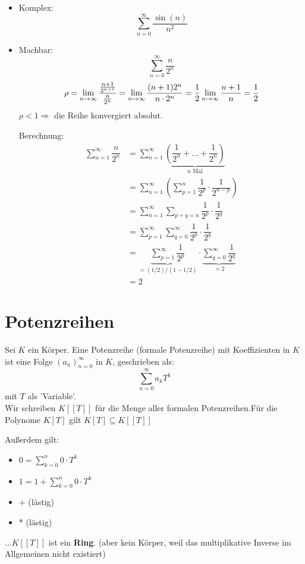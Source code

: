 \documentclass[main.tex]{subfiles}
\begin{document}
\begin{Beispiel}
  \begin{itemize}
    \item Komplex:
      $$\sum \limits_{n=0}^\infty \dfrac{\sin(n)}{n^2}$$
    \item Machbar:
      $$\sum \limits_{n=0}^\infty \dfrac{n}{2^n}$$
      $$\rho = \lim \limits_{n \to \infty} \dfrac{\frac{n+1}{2^{n+1}}}{\frac{n}{2^n}} = \lim \limits_{n \to \infty} \dfrac{(n+1)2^n}{n \cdot 2^n} = \dfrac{1}{2} \lim \limits_{n \to \infty} \dfrac{n+1}{n} = \dfrac{1}{2}$$
      $\rho < 1 \Rightarrow$ die Reihe konvergiert absolut.

      Berechnung:
      $$\begin{aligned}
        \sum \limits_{n=1}^\infty \dfrac{n}{2^n}
        &= \sum \limits_{n=1}^\infty \underbrace{\left(\dfrac{1}{2^n} + ... + \dfrac{1}{2^n}\right)}_{n \text{ Mal}}\\
        &= \sum \limits_{n=1}^\infty \left(\sum \limits_{p=1}^n \dfrac{1}{2^p} \cdot \dfrac{1}{2^{n-p}}\right)\\
        &= \sum \limits_{n=1}^\infty \sum \limits_{p + q = n} \dfrac{1}{2^p} \cdot \dfrac{1}{2^q}\\
        &= \sum \limits_{p=1}^\infty \sum \limits_{q=0}^\infty \dfrac{1}{2^p} \cdot \dfrac{1}{2^q}\\
        &= \underbrace{\sum \limits_{p=1}^\infty \dfrac{1}{2^p}}_{= (1/2)/(1-1/2)} \cdot \underbrace{\sum \limits_{q=0}^\infty \dfrac{1}{2^q}}_{= 2}\\
        &= 2
    \end{aligned}$$
  \end{itemize}
\end{Beispiel}


\section{Potenzreihen}

\begin{Definition}[Potenzreihe]
  Sei $K$ ein Körper. Eine Potenzreihe (formale Potenzreihe) mit Koeffizienten in $K$ ist eine Folge $(a_n)_{n=0}^\infty$ in $K$, geschrieben als:
  $$\sum \limits_{n=0}^\infty a_k T^k$$
  mit $T$ als 'Variable'.\\
  Wir schreiben $K[\![T]\!]$ für die Menge aller formalen Potenzreihen.Für die Polynome $K[T]$ gilt $K[T] \subseteq K[\![T]\!]$

  Außerdem gilt:
  \begin{itemize}
    \item $0 = \sum \limits_{k=0}^n 0 \cdot T^k$
    \item $1 = 1 + \sum \limits_{k=0}^n 0 \cdot T^k$
    \item + (lästig)
    \item * (lästig)
  \end{itemize}
  ...$K[\![T]\!]$ ist ein \textbf{Ring}. (aber kein Körper, weil das multiplikative Inverse im Allgemeinen nicht existiert)
\end{Definition}
\end{document}
